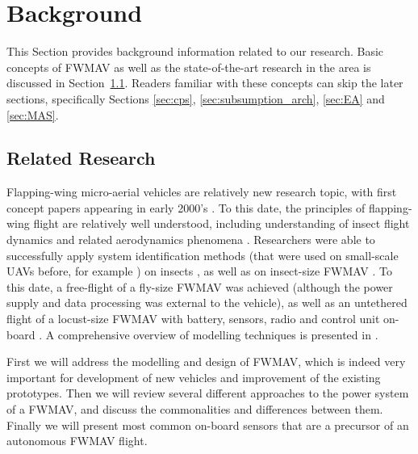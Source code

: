 \chapter{Background}
\label{ch:background}

This Section provides background information related to our research. Basic concepts of FWMAV as well as the state-of-the-art research in the area is discussed in Section~\ref{sec:Flapping-wing vehicles}. Readers familiar with these concepts can skip the later sections, specifically Sections \ref{sec:cps}, \ref{sec:subsumption_arch}, \ref{sec:EA} and \ref{sec:MAS}.



\section{Related Research}
\label{sec:Flapping-wing vehicles}

Flapping-wing micro-aerial vehicles are relatively new research topic, with first concept papers appearing in early 2000's \cite{Shimada2000} \cite{Yan2001} \cite{Wood2001} \cite{Yan2001a}. To this date, the principles of flapping-wing flight are relatively well understood, including understanding of insect flight dynamics \cite{Stevenson1995} \cite{Fry2003} \cite{Dickinson1996} and related aerodynamics phenomena \cite{Birch2001} \cite{Sunada2001}. Researchers were able to successfully apply system identification methods (that were used on small-scale UAVs before, for example \cite{Hoffer2015}) on insects \cite{Taylor2003}, as well as on insect-size FWMAV \cite{Finio2011}. To this date, a free-flight of a fly-size FWMAV was achieved \cite{Chirarattananon} (although the power supply and data processing was external to the vehicle), as well as an untethered flight of a locust-size FWMAV with battery, sensors, radio and control unit on-board \cite{Rosen2016}. A comprehensive overview of modelling techniques is presented in \cite{Vm2015}.

First we will address the modelling and design of FWMAV, which is indeed very important for development of new vehicles and improvement of the existing prototypes. Then we will review several different approaches to the power system of a FWMAV, and discuss the commonalities and differences between them. Finally we will present most common on-board sensors that are a precursor of an autonomous FWMAV flight.

